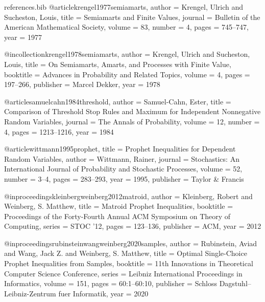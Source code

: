 \begin{filecontents*}{references.bib}
@article{krengel1977semiamarts,
  author = {Krengel, Ulrich and Sucheston, Louis},
  title = {Semiamarts and Finite Values},
  journal = {Bulletin of the American Mathematical Society},
  volume = {83},
  number = {4},
  pages = {745--747},
  year = {1977}
}

@incollection{krengel1978semiamarts,
  author = {Krengel, Ulrich and Sucheston, Louis},
  title = {On Semiamarts, Amarts, and Processes with Finite Value},
  booktitle = {Advances in Probability and Related Topics},
  volume = {4},
  pages = {197--266},
  publisher = {Marcel Dekker},
  year = {1978}
}

@article{samuelcahn1984threshold,
  author = {Samuel-Cahn, Ester},
  title = {Comparison of Threshold Stop Rules and Maximum for Independent Nonnegative Random Variables},
  journal = {The Annals of Probability},
  volume = {12},
  number = {4},
  pages = {1213--1216},
  year = {1984}
}

@article{wittmann1995prophet,
  title = {Prophet Inequalities for Dependent Random Variables},
  author = {Wittmann, Rainer},
  journal = {Stochastics: An International Journal of Probability and Stochastic Processes},
  volume = {52},
  number = {3--4},
  pages = {283--293},
  year = {1995},
  publisher = {Taylor \& Francis}
}

@inproceedings{kleinbergweinberg2012matroid,
  author = {Kleinberg, Robert and Weinberg, S. Matthew},
  title = {Matroid Prophet Inequalities},
  booktitle = {Proceedings of the Forty-Fourth Annual ACM Symposium on Theory of Computing},
  series = {STOC '12},
  pages = {123--136},
  publisher = {ACM},
  year = {2012}
}

@inproceedings{rubinsteinwangweinberg2020samples,
  author = {Rubinstein, Aviad and Wang, Jack Z. and Weinberg, S. Matthew},
  title = {Optimal Single-Choice Prophet Inequalities from Samples},
  booktitle = {11th Innovations in Theoretical Computer Science Conference},
  series = {Leibniz International Proceedings in Informatics},
  volume = {151},
  pages = {60:1--60:10},
  publisher = {Schloss Dagstuhl--Leibniz-Zentrum fuer Informatik},
  year = {2020}
}
\end{filecontents*}

\documentclass[10pt]{article}

\usepackage{amsmath, amssymb, amsthm}
\usepackage{url}
\usepackage[margin=1in]{geometry}
\usepackage[colorlinks=true, citecolor=blue, linkcolor=blue, urlcolor=blue]{hyperref}

